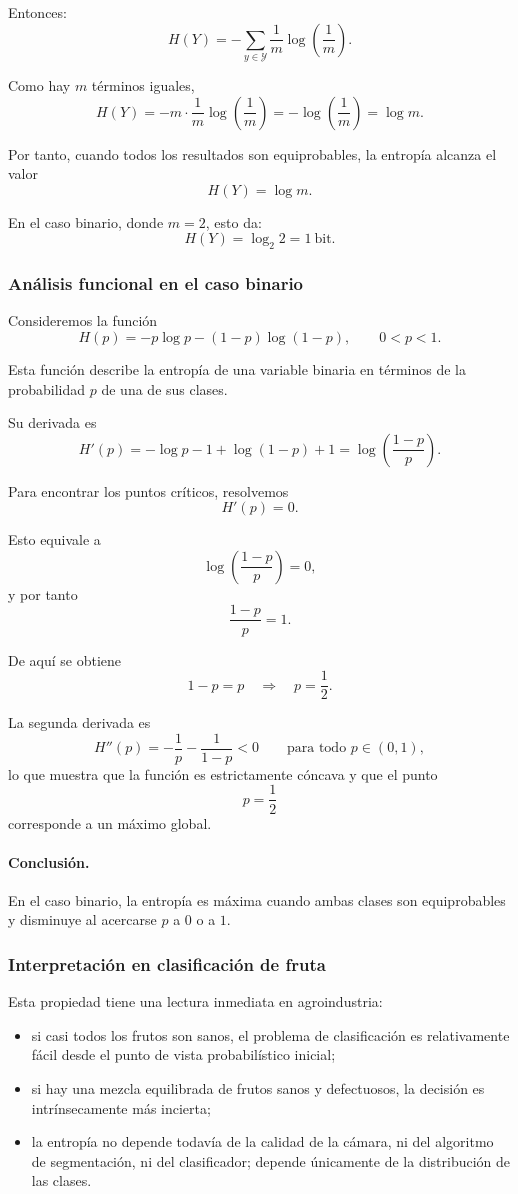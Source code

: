 \documentclass{article}
\begin{document}
Entonces:
\[
H(Y)= -\sum_{y\in\mathcal{Y}} \frac{1}{m}\log\left(\frac{1}{m}\right).
\]

Como hay \(m\) términos iguales,
\[
H(Y)= -m\cdot \frac{1}{m}\log\left(\frac{1}{m}\right)
= -\log\left(\frac{1}{m}\right)
= \log m.
\]

Por tanto, cuando todos los resultados son equiprobables, la entropía alcanza el valor
\[
H(Y)=\log m.
\]

En el caso binario, donde \(m=2\), esto da:
\[
H(Y)=\log_2 2 = 1\ \text{bit}.
\]

\subsubsection*{Análisis funcional en el caso binario}

Consideremos la función
\[
H(p)= -p\log p -(1-p)\log(1-p), \qquad 0<p<1.
\]

Esta función describe la entropía de una variable binaria en términos de la probabilidad \(p\) de una de sus clases.

Su derivada es
\[
H'(p)= -\log p -1 + \log(1-p)+1
= \log\left(\frac{1-p}{p}\right).
\]

Para encontrar los puntos críticos, resolvemos
\[
H'(p)=0.
\]

Esto equivale a
\[
\log\left(\frac{1-p}{p}\right)=0,
\]
y por tanto
\[
\frac{1-p}{p}=1.
\]

De aquí se obtiene
\[
1-p=p \quad \Rightarrow \quad p=\frac{1}{2}.
\]

La segunda derivada es
\[
H''(p)= -\frac{1}{p}-\frac{1}{1-p}<0
\qquad \text{para todo } p\in(0,1),
\]
lo que muestra que la función es estrictamente cóncava y que el punto
\[
p=\frac{1}{2}
\]
corresponde a un máximo global.

\paragraph{Conclusión.}
En el caso binario, la entropía es máxima cuando ambas clases son equiprobables y disminuye al acercarse \(p\) a \(0\) o a \(1\).

\subsubsection*{Interpretación en clasificación de fruta}

Esta propiedad tiene una lectura inmediata en agroindustria:

\begin{itemize}
\item si casi todos los frutos son sanos, el problema de clasificación es relativamente fácil desde el punto de vista probabilístico inicial;
\item si hay una mezcla equilibrada de frutos sanos y defectuosos, la decisión es intrínsecamente más incierta;
\item la entropía no depende todavía de la calidad de la cámara, ni del algoritmo de segmentación, ni del clasificador; depende únicamente de la distribución de las clases.
\end{itemize}
\end{document}
